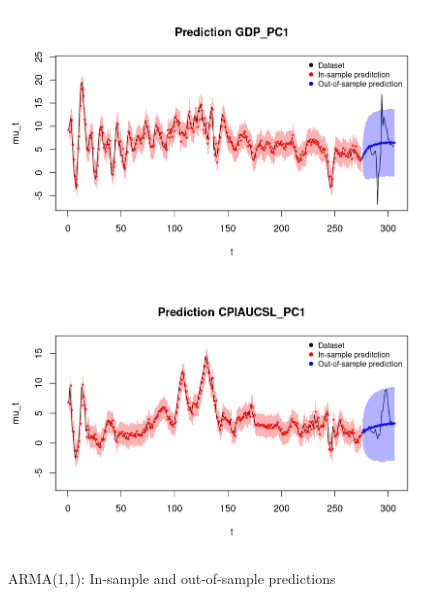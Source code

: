 \begin{figure}[h]
    \centering
    \begin{minipage}[t]{0.7\textwidth}
        \centering
        \includegraphics[width=\textwidth]{../Images/4-ARMA/gdp_prediction.png}
        \label{fig:ARMA_first}
    \end{minipage}
    \begin{minipage}[t]{0.7\textwidth}
        \centering
        \includegraphics[width=\textwidth]{../Images/4-ARMA/infl_prediction.png}
        \label{fig:ARMA_second}
    \end{minipage}
    \caption{ARMA(1,1): In-sample and out-of-sample predictions}
    \label{fig:ARMA_combined}
\end{figure}